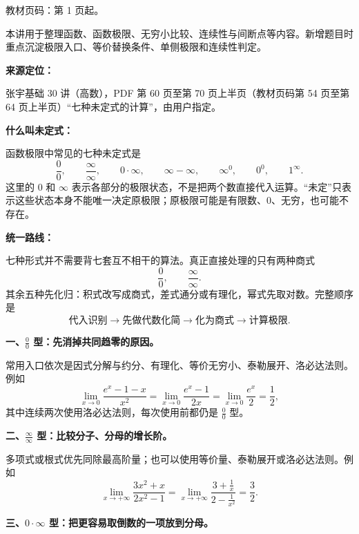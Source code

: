 
\begin{knowledgeBox}
教材页码：第 1 页起。

本讲用于整理函数、函数极限、无穷小比较、连续性与间断点等内容。新增题目时重点沉淀极限入口、等价替换条件、单侧极限和连续性判定。
\end{knowledgeBox}

\par

\begin{knowledgeBox}
\textbf{来源定位：}

张宇基础 30 讲（高数），PDF 第 60 页至第 70 页上半页（教材页码第 54 页至第 64 页上半页）“七种未定式的计算”，由用户指定。

\textbf{什么叫未定式：}

函数极限中常见的七种未定式是
\[
\frac{0}{0},\qquad
\frac{\infty}{\infty},\qquad
0\cdot\infty,\qquad
\infty-\infty,\qquad
\infty^0,\qquad
0^0,\qquad
1^\infty.
\]
这里的 \(0\) 和 \(\infty\) 表示各部分的极限状态，不是把两个数直接代入运算。“未定”只表示这些状态本身不能唯一决定原极限；原极限可能是有限数、\(0\)、无穷，也可能不存在。

\textbf{统一路线：}

七种形式并不需要背七套互不相干的算法。真正直接处理的只有两种商式
\[
\frac{0}{0},\qquad \frac{\infty}{\infty}.
\]
其余五种先化归：积式改写成商式，差式通分或有理化，幂式先取对数。完整顺序是
\[
\text{代入识别}
\longrightarrow
\text{先做代数化简}
\longrightarrow
\text{化为商式}
\longrightarrow
\text{计算极限}.
\]

\textbf{一、\(\frac{0}{0}\) 型：先消掉共同趋零的原因。}

常用入口依次是因式分解与约分、有理化、等价无穷小、泰勒展开、洛必达法则。例如
\[
\lim_{x\to0}\frac{e^x-1-x}{x^2}
=\lim_{x\to0}\frac{e^x-1}{2x}
=\lim_{x\to0}\frac{e^x}{2}
=\frac12,
\]
其中连续两次使用洛必达法则，每次使用前都仍是 \(\frac00\) 型。

\textbf{二、\(\frac{\infty}{\infty}\) 型：比较分子、分母的增长阶。}

多项式或根式优先同除最高阶量；也可以使用等价量、泰勒展开或洛必达法则。例如
\[
\lim_{x\to+\infty}\frac{3x^2+x}{2x^2-1}
=\lim_{x\to+\infty}\frac{3+\frac1x}{2-\frac1{x^2}}
=\frac32.
\]

\textbf{三、\(0\cdot\infty\) 型：把更容易取倒数的一项放到分母。}


\end{knowledgeBox}
